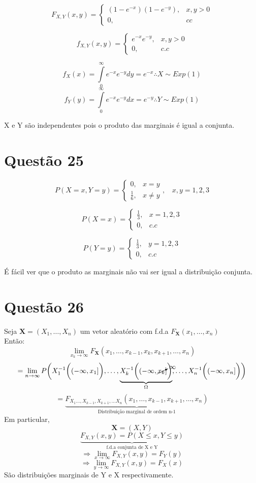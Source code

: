 \documentclass[a4paper,12pt]{report}
\begin{document}
	$$F_{X,Y}(x,y) = \begin{cases}
	(1-e^{-x})(1-e^{-y}), & x,y>0\\
	0, & cc
	\end{cases} $$
	
	$$
	f_{X,Y}(x,y)=\begin{cases}
	e^{-x}	e^{-y}, & x,y > 0\\
	0, & c.c
	\end{cases}
	$$
	
	$$
	f_X(x) = \int\limits_0^\infty 	e^{-x}	e^{-y} dy = 	e^{-x}\therefore X \sim Exp(1)
	$$
		$$
	f_Y(y) = \int\limits_0^\infty 	e^{-x}	e^{-y} dx = 	e^{-y}\therefore Y \sim Exp(1)
	$$
	
	X e Y são independentes pois o produto das marginais é igual a conjunta.
		\section{Questão 25}	 	
  $$P(X=x,Y=y)=\begin{cases}
			0, & x=y\\
			\frac{1}{6}, & x\ne y
			\end{cases}, \ \ \ \  x,y=1,2,3$$

		
		
		$$P(X=x)= \begin{cases}
		\frac{1}{3}, & x=1,2,3\\
		0, & c.c
		\end{cases} $$
		
			
		$$P(Y=y)= \begin{cases}
		\frac{1}{3}, & y=1,2,3\\
		0, & c.c
		\end{cases} $$
		
		É fácil ver que o produto as marginais não vai ser igual a distribuição conjunta.
		\newpage 
		\section{Questão 26}
		Seja $\bm X=(X_1,\ldots,X_n )$ um vetor aleatório com f.d.a $F_{\bm X}(x_1,\ldots,x_n)$\\
		Então:
		$$\lim\limits_{x_k\rightarrow \infty}F_{\bm X}(x_1,\ldots,x_{k-1},x_k,x_{k+1},\ldots,x_n)$$
		$$ =
		\lim\limits_{n\rightarrow \infty} P\bigg(
		X_1^{-1}\bigg((-\infty,x_1]\bigg),\ldots, \underbrace{X_k^{-1}\bigg((-\infty,\cancelto{\infty}{x_k}]\bigg)}_{\Omega},\ldots, X_n^{-1}\bigg((-\infty,x_n]\bigg)
		\bigg)$$
		$$= \underbrace{F_{X_1\ldots,X_{k-1},X_{k+1},\ldots X_n}(x_1,\ldots,x_{k-1},x_{k+1},\ldots,x_n)}_{\text{Distribuição marginal de ordem n-1}} $$ 
		Em particular,
		$$\bm X=(X,Y) $$
		$$ \underbrace{F_{X,Y}(x,y) = P(X\le  x,Y\le y)}_{\text{f.d.a conjunta de X e Y}} $$
		$$\Rightarrow \lim\limits_{x\rightarrow \infty} F_{X,Y}(x,y)=F_Y(y) $$
		$$\Rightarrow \lim\limits_{y\rightarrow \infty} F_{X,Y}(x,y)=F_X(x) $$
		São distribuições marginais de Y e X respectivamente.
		
\end{document}
